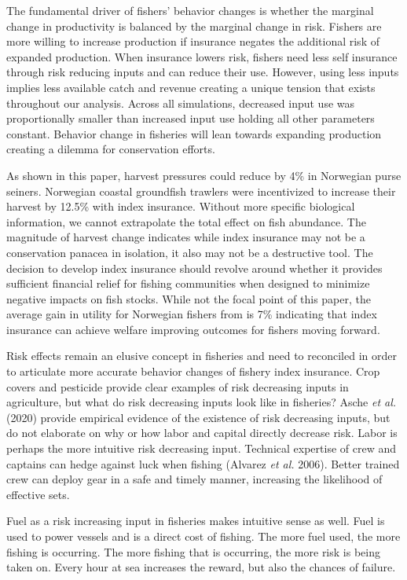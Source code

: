 \documentclass[
  letterpaper,
  DIV=11,
  numbers=noendperiod]{scrartcl}
\theoremstyle{plain}
\theoremstyle{plain}
\theoremstyle{remark}
\begin{document}
The fundamental driver of fishers' behavior changes is whether the
marginal change in productivity is balanced by the marginal change in
risk. Fishers are more willing to increase production if insurance
negates the additional risk of expanded production. When insurance
lowers risk, fishers need less self insurance through risk reducing
inputs and can reduce their use. However, using less inputs implies less
available catch and revenue creating a unique tension that exists
throughout our analysis. Across all simulations, decreased input use was
proportionally smaller than increased input use holding all other
parameters constant. Behavior change in fisheries will lean towards
expanding production creating a dilemma for conservation efforts.

As shown in this paper, harvest pressures could reduce by 4\% in
Norwegian purse seiners. Norwegian coastal groundfish trawlers were
incentivized to increase their harvest by 12.5\% with index insurance.
Without more specific biological information, we cannot extrapolate the
total effect on fish abundance. The magnitude of harvest change
indicates while index insurance may not be a conservation panacea in
isolation, it also may not be a destructive tool. The decision to
develop index insurance should revolve around whether it provides
sufficient financial relief for fishing communities when designed to
minimize negative impacts on fish stocks. While not the focal point of
this paper, the average gain in utility for Norwegian fishers from is
7\% indicating that index insurance can achieve welfare improving
outcomes for fishers moving forward.

Risk effects remain an elusive concept in fisheries and need to
reconciled in order to articulate more accurate behavior changes of
fishery index insurance. Crop covers and pesticide provide clear
examples of risk decreasing inputs in agriculture, but what do risk
decreasing inputs look like in fisheries? Asche \emph{et al.} (2020)
provide empirical evidence of the existence of risk decreasing inputs,
but do not elaborate on why or how labor and capital directly decrease
risk. Labor is perhaps the more intuitive risk decreasing input.
Technical expertise of crew and captains can hedge against luck when
fishing (Alvarez \emph{et al.} 2006). Better trained crew can deploy
gear in a safe and timely manner, increasing the likelihood of effective
sets.

Fuel as a risk increasing input in fisheries makes intuitive sense as
well. Fuel is used to power vessels and is a direct cost of fishing. The
more fuel used, the more fishing is occurring. The more fishing that is
occurring, the more risk is being taken on. Every hour at sea increases
the reward, but also the chances of failure.
\end{document}
